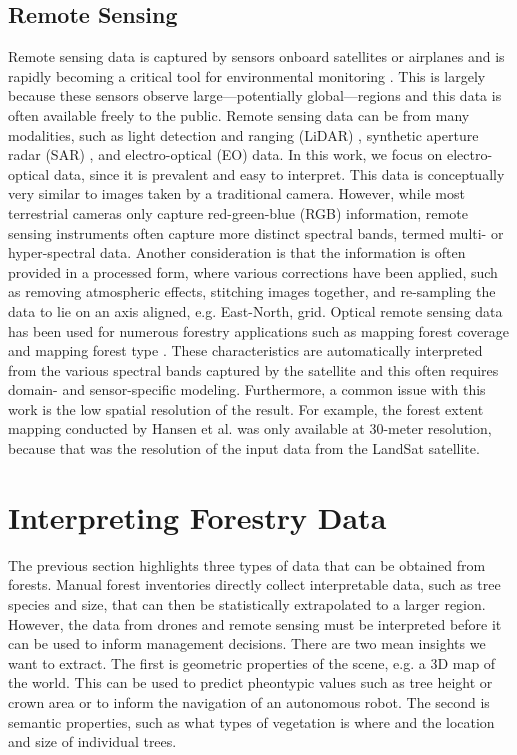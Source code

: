\subsection{Remote Sensing}
Remote sensing data is captured by sensors onboard satellites or airplanes and is rapidly becoming a critical tool for environmental monitoring \cite{Parra2022RemoteMonitoring}. This is largely because these sensors observe large---potentially global---regions and this data is often available freely to the public. 
Remote sensing data can be from many modalities, such as light detection and ranging (LiDAR) \cite{LiDARForestryBeland2019}, synthetic aperture radar (SAR) \cite{Hall2020WhatEarthdata}, and electro-optical (EO) data.
In this work, we focus on electro-optical data, since it is prevalent and easy to interpret. This data is conceptually very similar to images taken by a traditional camera. However, while most terrestrial cameras only capture red-green-blue (RGB) information, remote sensing instruments often capture more distinct spectral bands, termed multi- or hyper-spectral data. Another consideration is that the information is often provided in a processed form, where various corrections have been applied, such as removing atmospheric effects, stitching images together, and re-sampling the data to lie on an axis aligned, e.g. East-North, grid. 
Optical remote sensing data has been used for numerous forestry applications such as mapping forest coverage \cite{ Hansen2013High-resolutionChange} and mapping forest type \cite{Kempeneers2011DataMapping}. These characteristics are automatically interpreted from the various spectral bands captured by the satellite and this often requires domain- and sensor-specific modeling. Furthermore, a common issue with this work is the low spatial resolution of the result. For example, the forest extent mapping conducted by Hansen et al. \cite{Hansen2013High-resolutionChange} was only available at 30-meter resolution, because that was the resolution of the input data from the LandSat satellite.



\section{Interpreting Forestry Data}
The previous section highlights three types of data that can be obtained from forests. Manual forest inventories directly collect interpretable data, such as tree species and size, that can then be statistically extrapolated to a larger region. However, the data from drones and remote sensing must be interpreted before it can be used to inform management decisions. There are two mean insights we want to extract. The first is geometric properties of the scene, e.g. a 3D map of the world. This can be used to predict pheontypic values such as tree height or crown area or to inform the navigation of an autonomous robot. The second is semantic properties, such as what types of vegetation is where and the location and size of individual trees. 


